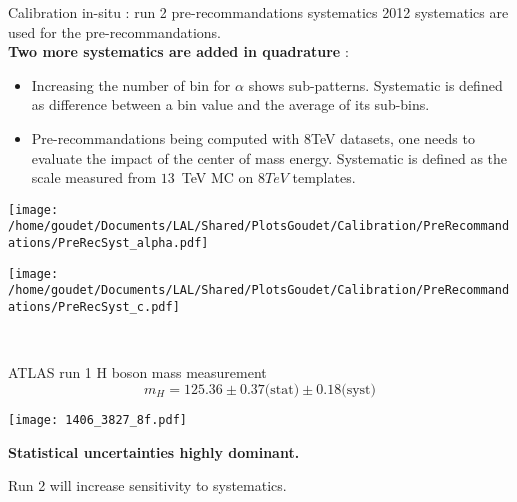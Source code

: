 
\begin{frame}{Calibration in-situ : run 2 pre-recommandations systematics}
2012 systematics are used for the pre-recommandations. \\
{\bf Two more systematics are added in quadrature } :
\begin{itemize}
\item Increasing the number of bin for $\alpha$ shows sub-patterns. 
  Systematic is defined as difference between a bin value and the average of its sub-bins.
\item Pre-recommandations being computed with 8TeV datasets, one needs to evaluate the impact of the center of mass energy.
Systematic is defined as the scale measured from $13$~TeV MC on $8TeV$ templates.
\end{itemize}
  \begin{minipage}{0.49\linewidth}
    \texttt{[image: /home/goudet/Documents/LAL/Shared/PlotsGoudet/Calibration/PreRecommandations/PreRecSyst\_alpha.pdf]}
  \end{minipage}
  \hfill
  \begin{minipage}{0.49\linewidth}
    \texttt{[image: /home/goudet/Documents/LAL/Shared/PlotsGoudet/Calibration/PreRecommandations/PreRecSyst\_c.pdf]}
  \end{minipage}\\
\end{frame}

\begin{frame}{ATLAS run 1 H boson mass measurement}
\centering
$$m_H = 125.36 \pm 0.37 \text{(stat)} \pm 0.18 \text{(syst)}$$
\begin{minipage}{0.49\linewidth}
  \texttt{[image: 1406\_3827\_8f.pdf]}
\end{minipage}
\hfill
\begin{minipage}{0.49\linewidth}
\end{minipage}
    {\bf Statistical uncertainties highly dominant.}\\
    \begin{center}   Run 2 will increase sensitivity to systematics.\end{center}
\end{frame}
